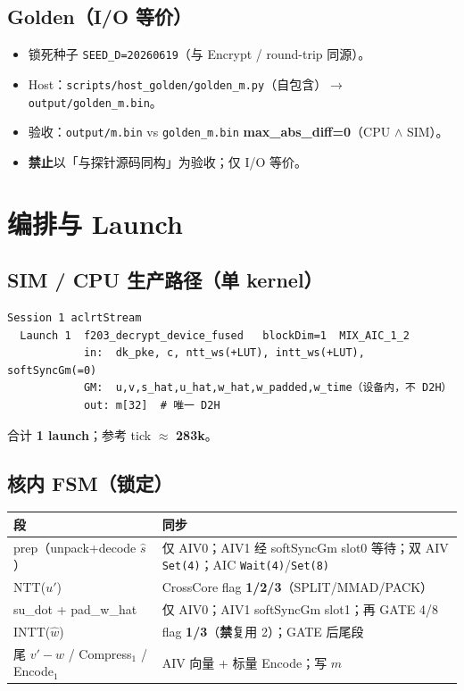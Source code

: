 \documentclass[UTF8,a4paper,11pt]{ctexart}
\begin{document}
\subsection{Golden（I/O 等价）}

\begin{itemize}
  \item 锁死种子 \texttt{SEED\_D=20260619}（与 Encrypt / round-trip 同源）。
  \item Host：\texttt{scripts/host\_golden/golden\_m.py}（自包含）$\to$\texttt{output/golden\_m.bin}。
  \item 验收：\texttt{output/m.bin} vs \texttt{golden\_m.bin} \textbf{max\_abs\_diff=0}（CPU $\land$ SIM）。
  \item \textbf{禁止}以「与探针源码同构」为验收；仅 I/O 等价。
\end{itemize}

\section{编排与 Launch}
\label{sec:launch}

\subsection{SIM / CPU 生产路径（单 kernel）}

\begin{verbatim}
Session 1 aclrtStream
  Launch 1  f203_decrypt_device_fused   blockDim=1  MIX_AIC_1_2
            in:  dk_pke, c, ntt_ws(+LUT), intt_ws(+LUT), softSyncGm(=0)
            GM:  u,v,s_hat,u_hat,w_hat,w_padded,w_time（设备内，不 D2H）
            out: m[32]  # 唯一 D2H
\end{verbatim}

合计 \textbf{1 launch}；参考 tick $\approx$ \textbf{283k}。

\subsection{核内 FSM（锁定）}

\begin{longtable}{@{}L{3.5cm}L{9.5cm}@{}}
\toprule
段 & 同步 \\
\midrule
prep（unpack+decode $\hat{s}$） & 仅 AIV0；AIV1 经 softSyncGm slot0 等待；双 AIV \texttt{Set(4)}；AIC \texttt{Wait(4)}/\texttt{Set(8)} \\
NTT($u'$) & CrossCore flag \textbf{1/2/3}（SPLIT/MMAD/PACK） \\
su\_dot + pad\_w\_hat & 仅 AIV0；AIV1 softSyncGm slot1；再 GATE 4/8 \\
INTT($\hat{w}$) & flag \textbf{1/3}（\textbf{禁}复用 2）；GATE 后尾段 \\
尾 $v'-w$ / Compress$_1$ / Encode$_1$ & AIV 向量 + 标量 Encode；写 $m$ \\
\bottomrule
\end{longtable}
\end{document}
